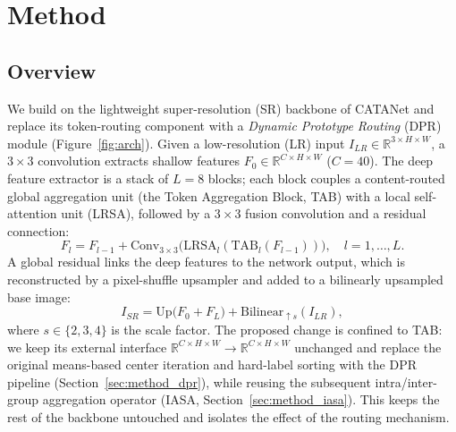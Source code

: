 \section{Method}
\label{sec:method}

\subsection{Overview}
\label{sec:method_overview}
We build on the lightweight super-resolution (SR) backbone of CATANet and replace
its token-routing component with a \emph{Dynamic Prototype Routing} (DPR) module
(Figure~\ref{fig:arch}).
Given a low-resolution (LR) input $I_{LR}\in\mathbb{R}^{3\times H\times W}$, a
$3\times3$ convolution extracts shallow features
$F_0\in\mathbb{R}^{C\times H\times W}$ ($C{=}40$). The deep feature extractor is a
stack of $L{=}8$ blocks; each block couples a content-routed global aggregation
unit (the Token Aggregation Block, TAB) with a local self-attention unit (LRSA),
followed by a $3\times3$ fusion convolution and a residual connection:
\begin{equation}
F_l = F_{l-1} + \mathrm{Conv}_{3\times3}\!\big(\mathrm{LRSA}_l(\mathrm{TAB}_l(F_{l-1}))\big),
\quad l=1,\dots,L.
\end{equation}
A global residual links the deep features to the network output, which is
reconstructed by a pixel-shuffle upsampler and added to a bilinearly upsampled
base image:
\begin{equation}
I_{SR} = \mathrm{Up}\big(F_0 + F_L\big) + \mathrm{Bilinear}_{\uparrow s}(I_{LR}),
\end{equation}
where $s\in\{2,3,4\}$ is the scale factor. The proposed change is confined to TAB:
we keep its external interface
$\mathbb{R}^{C\times H\times W}\!\to\!\mathbb{R}^{C\times H\times W}$ unchanged and
replace the original means-based center iteration and hard-label sorting with
the DPR pipeline (Section~\ref{sec:method_dpr}), while reusing the subsequent
intra/inter-group aggregation operator (IASA, Section~\ref{sec:method_iasa}). This
keeps the rest of the backbone untouched and isolates the effect of the routing
mechanism.

